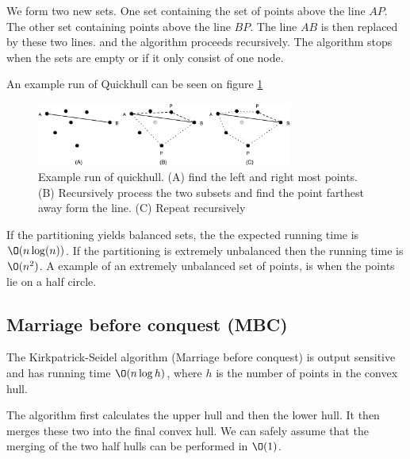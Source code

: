 \documentclass[10pt]{article}
\begin{document}
We form two new sets. One set containing the set of points above the line $AP$. The other set containing points above the line $BP$. The line $AB$ is then replaced by these two lines. and the algorithm proceeds recursively. The algorithm stops when the sets are empty or if it only consist of one node.

An example run of Quickhull can be seen on figure \ref{fig18} 

\begin{figure}[ht]
\centering
\includegraphics[width=0.75\textwidth]{figures/fig18.pdf}
\caption{Example run of quickhull. (A) find the left and right most points. (B) Recursively process the two subsets and find the point farthest away form the line. (C) Repeat recursively}
\label{fig18}
\end{figure}


If the partitioning yields balanced sets, the the expected running time is $\O(n\log(n))$. If the partitioning is extremely unbalanced then the running time is $\O(n^2)$. A example of an extremely unbalanced set of points, is when the points lie on a half circle.




\subsection{Marriage before conquest (MBC)} %
\label{sub:marriage_before_conquest_mbc_}
The Kirkpatrick-Seidel algorithm (Marriage before conquest) is output sensitive and has running time $\O(n\log{h})$, where $h$ is the number of points in the convex hull.

The algorithm first calculates the upper hull and then the lower hull. It then merges these two into the final convex hull. We can safely assume that the merging of the two half hulls can be performed in $\O(1)$.
\end{document}
